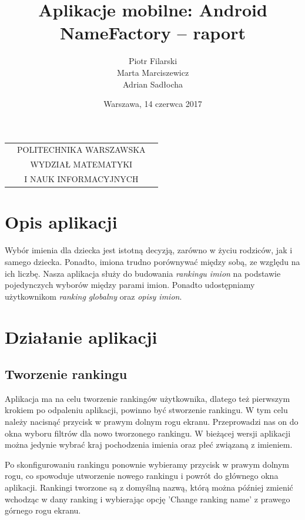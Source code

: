 \documentclass[12pt,a4paper]{article}
\begin{document}
\begin{table}[t]
\centering
\begin{tabular}[t]{lcr}
& POLITECHNIKA WARSZAWSKA & \\
& WYDZIAŁ MATEMATYKI & \\
& I NAUK INFORMACYJNYCH &
\end{tabular}
\end{table}

\author{Piotr Filarski \\ Marta Marciszewicz \\ Adrian Sadłocha}
\title{Aplikacje mobilne: Android \\ NameFactory -- raport}
\date{Warszawa, 14 czerwca 2017}

\maketitle

\section*{Opis aplikacji}
Wybór imienia dla dziecka jest istotną decyzją, zarówno w życiu rodziców, jak i samego dziecka.
Ponadto, imiona trudno porównywać między sobą, ze względu na ich liczbę.
Nasza aplikacja służy do budowania \textit{rankingu imion} na podstawie pojedynczych wyborów między parami imion.
Ponadto udostępniamy użytkownikom \textit{ranking globalny} oraz \textit{opisy imion}.
\newpage

\section{Działanie aplikacji}
\subsection{Tworzenie rankingu}

Aplikacja ma na celu tworzenie rankingów użytkownika, dlatego też pierwszym krokiem po odpaleniu aplikacji, powinno być stworzenie rankingu.
W tym celu należy nacisnąć przycisk w prawym dolnym rogu ekranu.
Przeprowadzi nas on do okna wyboru filtrów dla nowo tworzonego rankingu.
W bieżącej wersji aplikacji można jedynie wybrać kraj pochodzenia imienia oraz płeć związaną z imieniem.

Po skonfigurowaniu rankingu ponownie wybieramy przycisk w prawym dolnym rogu, co spowoduje utworzenie nowego rankingu i powrót do głównego okna aplikacji.
Rankingi tworzone są z domyślną nazwą, którą można później zmienić wchodząc w dany ranking i wybierając opcję 'Change ranking name' z prawego górnego rogu ekranu.
\end{document}
